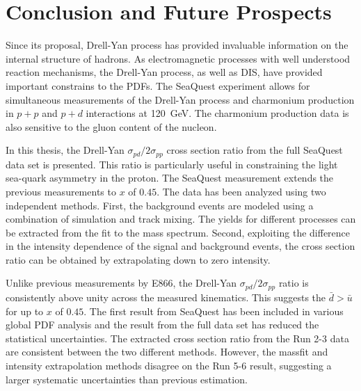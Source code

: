 \documentclass[../main.tex]{subfiles}
\begin{document}
\ifSubfilesClassLoaded{
	\mainmatter
	\setcounter{chapter}{5}
}{}

\chapter{Conclusion and Future Prospects}
\label{ch:conclusion}
Since its proposal, Drell-Yan process has provided invaluable information
on the internal structure of hadrons.
As electromagnetic processes with well understood reaction mechanisms,
the Drell-Yan process, as well as DIS, have provided important constrains to the PDFs. 
The SeaQuest experiment allows for simultaneous measurements of the Drell-Yan process
and charmonium production in $p+p$ and $p+d$ interactions at \SI{120}{\GeV}.
The charmonium production data is also sensitive to the gluon content of the nucleon.

In this thesis, the Drell-Yan $\sigma_{pd}/2\sigma_{pp}$ cross section ratio from the full
SeaQuest data set is presented. This ratio is particularly useful in constraining
the light sea-quark asymmetry in the proton. The SeaQuest measurement extends the
previous measurements to $x$ of $0.45$.
The data has been analyzed using two independent methods.
First, the background events are modeled using a combination of simulation and
track mixing. The yields for different processes can be extracted from the fit to
the mass spectrum.
Second, exploiting the difference in the intensity dependence of the signal and background events,
the cross section ratio can be obtained by extrapolating down to zero intensity.

Unlike previous measurements by E866, the  Drell-Yan $\sigma_{pd}/2\sigma_{pp}$ ratio
is consistently above unity across the measured kinematics.
This suggests the $\bar{d}>\bar{u}$ for up to $x$ of $0.45$.
The first result from SeaQuest has been included in various global PDF analysis
and the result from the full data set has reduced the statistical uncertainties.
The extracted cross section ratio from the Run 2-3
data are consistent between the two different methods. However, the massfit
and intensity extrapolation methods disagree on the Run 5-6 result,
suggesting a larger systematic uncertainties than previous estimation.
\end{document}
